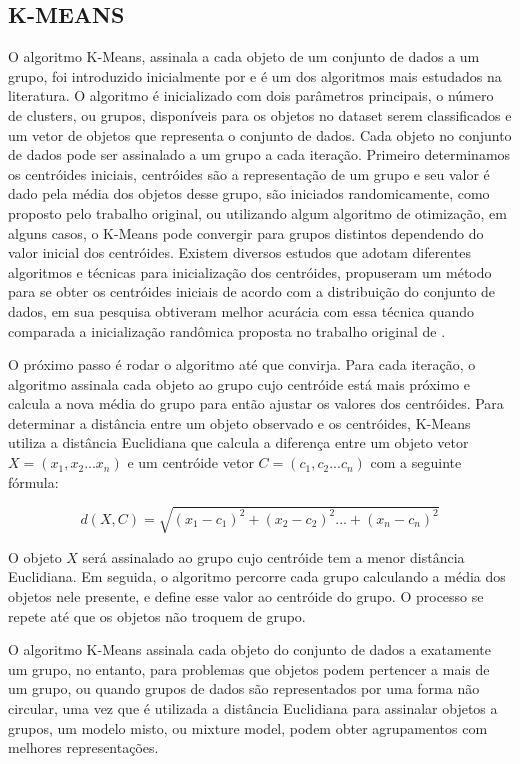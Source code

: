 \documentclass[12pt,a4paper]{article}
\begin{document}
\subsection{K-MEANS}
O algoritmo K-Means, assinala a cada objeto de um conjunto de dados a um grupo, foi introduzido inicialmente por  e é um dos algoritmos mais estudados na literatura.
 O algoritmo é inicializado com dois parâmetros principais, o número de clusters, ou grupos, disponíveis para os objetos no dataset serem classificados e um vetor de objetos que representa o conjunto de dados.
 Cada objeto no conjunto de dados pode ser assinalado a um grupo a cada iteração. Primeiro determinamos os centróides iniciais,
 centróides são a representação de um grupo e seu valor é dado pela média dos objetos desse grupo, são iniciados randomicamente, como proposto  pelo trabalho original,
 ou utilizando algum algoritmo de otimização, em alguns casos, o K-Means pode convergir para grupos distintos dependendo do valor inicial dos centróides. 
 Existem diversos estudos que adotam diferentes algoritmos e técnicas para inicialização dos centróides,
  propuseram um método para se obter os centróides iniciais de acordo com a distribuição do conjunto de dados,
 em sua pesquisa obtiveram melhor acurácia com essa técnica quando comparada a inicialização randômica proposta no trabalho original de .

O próximo passo é rodar o algoritmo até que convirja. Para cada iteração,
 o algoritmo assinala cada objeto ao grupo cujo centróide está mais próximo e calcula a nova média do grupo para então ajustar os valores dos centróides.
 Para determinar a distância entre um objeto observado e os centróides, K-Means utiliza a distância Euclidiana que calcula a diferença entre um objeto vetor \(X=(x_1, x_2... x_n)\) 
 e um centróide vetor \(C=(c_1, c_2... c_n)\) com a seguinte fórmula: 

\begin{equation}
d(X,C) = \sqrt{(x_1 - c_1)^2 + (x_2 - c_2)^2 ... + (x_n - c_n)^2}
\end{equation}

O objeto $X$ será assinalado ao grupo cujo centróide tem a menor distância Euclidiana. Em seguida, o algoritmo percorre cada grupo calculando a média dos objetos nele presente,
 e define esse valor ao centróide do grupo. O processo se repete até que os objetos não troquem de grupo.

O algoritmo K-Means assinala cada objeto do conjunto de dados a exatamente um grupo, no entanto, para problemas que objetos podem pertencer a mais de um grupo,
 ou quando grupos de dados são representados por uma forma não circular, uma vez que é  utilizada a distância Euclidiana para assinalar objetos a grupos, um modelo misto, ou mixture model,
 podem obter agrupamentos com melhores representações.
\end{document}
